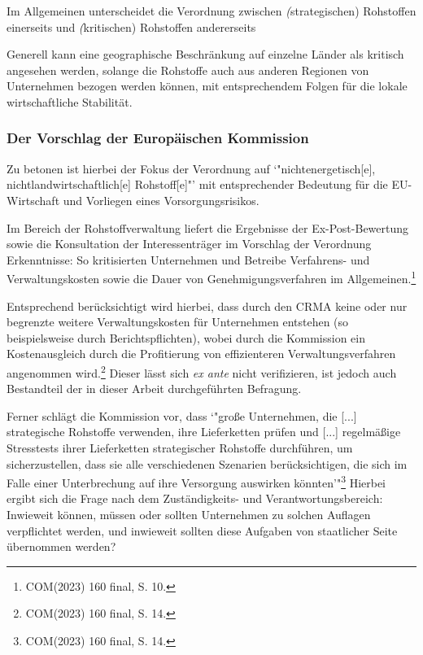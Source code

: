 \documentclass[12pt,a4paper,oneside]{book} %
\begin{document}
	Im Allgemeinen unterscheidet die Verordnung zwischen \textit(strategischen) Rohstoffen einerseits und \textit(kritischen) Rohstoffen andererseits
	
	Generell kann eine geographische Beschränkung auf einzelne Länder als kritisch angesehen werden, solange die Rohstoffe auch aus anderen Regionen von Unternehmen bezogen werden können, mit entsprechendem Folgen für die lokale wirtschaftliche Stabilität.\autocite[s. hierzu]{ruettinger_doddfrank_2015}
	
	\subsubsection{Der Vorschlag der Europäischen Kommission}
	
	Zu betonen ist hierbei der Fokus der Verordnung auf `"nichtenergetisch[e], nichtlandwirtschaftlich[e] Rohstoff[e]"' mit entsprechender Bedeutung für die EU-Wirtschaft und Vorliegen eines Vorsorgungsrisikos.
	
	Im Bereich der Rohstoffverwaltung liefert die Ergebnisse der Ex-Post-Bewertung sowie die Konsultation der Interessenträger im Vorschlag der Verordnung Erkenntnisse: So kritisierten Unternehmen und Betreibe Verfahrens- und Verwaltungskosten sowie die Dauer von Genehmigungsverfahren im Allgemeinen.\footnote{COM(2023) 160 final, S. 10.}
	
	Entsprechend berücksichtigt wird hierbei, dass durch den CRMA keine oder nur begrenzte weitere Verwaltungskosten für Unternehmen entstehen (so beispielsweise durch Berichtspflichten), wobei durch die Kommission ein Kostenausgleich durch die Profitierung von effizienteren Verwaltungsverfahren angenommen wird.\footnote{COM(2023) 160 final, S. 14.} Dieser lässt sich \textit{ex ante} nicht verifizieren, ist jedoch auch Bestandteil der in dieser Arbeit durchgeführten Befragung. %
	
	Ferner schlägt die Kommission vor, dass `"große Unternehmen, die [...] strategische Rohstoffe verwenden, ihre Lieferketten prüfen und [...] regelmäßige Stresstests ihrer Lieferketten strategischer Rohstoffe durchführen, um sicherzustellen, dass sie alle verschiedenen Szenarien berücksichtigen, die sich im Falle einer Unterbrechung auf ihre Versorgung auswirken
	könnten'"\footnote{COM(2023) 160 final, S. 14.} Hierbei ergibt sich die Frage nach dem Zuständigkeits- und Verantwortungsbereich: Inwieweit können, müssen oder sollten Unternehmen zu solchen Auflagen verpflichtet werden, und inwieweit sollten diese Aufgaben von staatlicher Seite übernommen werden?
	
\end{document}
